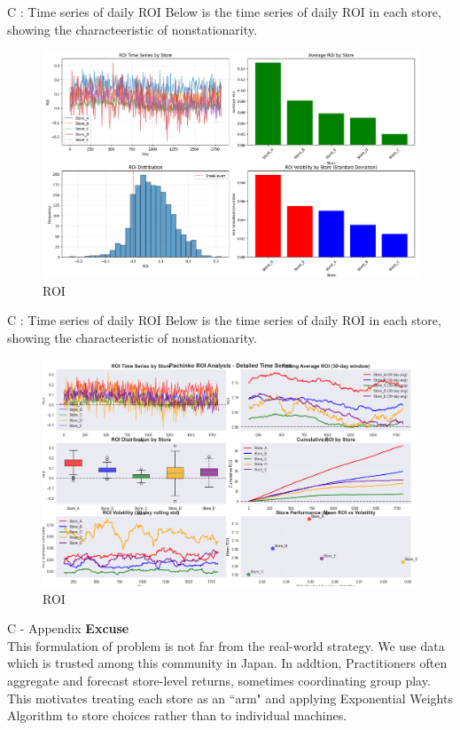 \documentclass{beamer}
\begin{document}
\begin{frame}{C : Time series of daily ROI}
Below is the time series of daily ROI in each store, showing the characteeristic of nonstationarity.
\begin{figure}
    \centering
    \includegraphics[width=0.5\linewidth]{332Project2/figures/ROI.png}
    \caption{ROI}
    \label{fig:placeholder}
\end{figure}
    
\end{frame}

\begin{frame}{C : Time series of daily ROI}
Below is the time series of daily ROI in each store, showing the characteeristic of nonstationarity.
    \begin{figure}
        \centering
        \includegraphics[width=0.5\linewidth]{332Project2/figures/ROI_detailed.png}
        \caption{ROI}
        \label{fig:placeholder}
    \end{figure}
\end{frame}


\begin{frame}{C - Appendix}
    \textbf{Excuse}\\
    This formulation of problem is not far from the real-world strategy. We use data which is trusted among this community in Japan. In addtion, Practitioners often aggregate and forecast store-level returns, sometimes coordinating group play.\\
    This motivates treating each store as an “arm" and applying Exponential Weights Algorithm to store choices rather than to individual machines. 
\end{frame}
\end{document}
